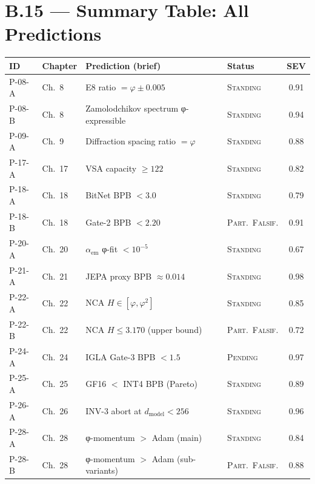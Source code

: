 \section*{B.15 — Summary Table: All Predictions}
\label{sec:summary-table}

\begin{center}
\begin{tabular}{p{1.2cm}p{2cm}p{4cm}p{2.2cm}c}
\hline
\textbf{ID} & \textbf{Chapter} & \textbf{Prediction (brief)} &
\textbf{Status} & \textbf{SEV} \\
\hline
P-08-A & Ch.\ 8  & E8 ratio $= \varphi \pm 0.005$      & \textsc{Standing}       & 0.91 \\
P-08-B & Ch.\ 8  & Zamolodchikov spectrum φ-expressible & \textsc{Standing}       & 0.94 \\
P-09-A & Ch.\ 9  & Diffraction spacing ratio $= \varphi$& \textsc{Standing}       & 0.88 \\
P-17-A & Ch.\ 17 & VSA capacity $\geq 122$              & \textsc{Standing}       & 0.82 \\
P-18-A & Ch.\ 18 & BitNet BPB $< 3.0$                   & \textsc{Standing}       & 0.79 \\
P-18-B & Ch.\ 18 & Gate-2 BPB $< 2.20$                  & \textsc{Part.\ Falsif.} & 0.91 \\
P-20-A & Ch.\ 20 & $\alpha_{\mathrm{em}}$ φ-fit $< 10^{-5}$ & \textsc{Standing}  & 0.67 \\
P-21-A & Ch.\ 21 & JEPA proxy BPB $\approx 0.014$       & \textsc{Standing}       & 0.98 \\
P-22-A & Ch.\ 22 & NCA $H \in [\varphi, \varphi^{2}]$   & \textsc{Standing}       & 0.85 \\
P-22-B & Ch.\ 22 & NCA $H \leq 3.170$ (upper bound)     & \textsc{Part.\ Falsif.} & 0.72 \\
P-24-A & Ch.\ 24 & IGLA Gate-3 BPB $< 1.5$              & \textsc{Pending}        & 0.97 \\
P-25-A & Ch.\ 25 & GF16 $<$ INT4 BPB (Pareto)           & \textsc{Standing}       & 0.89 \\
P-26-A & Ch.\ 26 & INV-3 abort at $d_{\text{model}}<256$& \textsc{Standing}       & 0.96 \\
P-28-A & Ch.\ 28 & φ-momentum $>$ Adam (main)           & \textsc{Standing}       & 0.84 \\
P-28-B & Ch.\ 28 & φ-momentum $>$ Adam (sub-variants)   & \textsc{Part.\ Falsif.} & 0.88 \\

\end{tabular}
\end{center}
